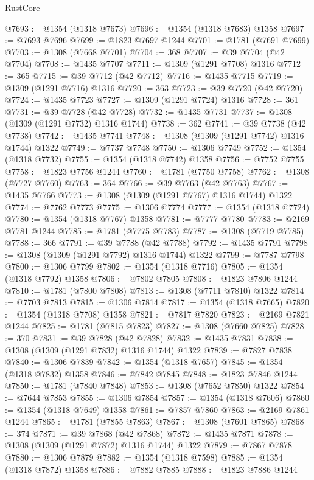 \begin{lexlean}{RustCore}
\begin{coremodule}
@7693 := @1354 (@1318 @7673)
@7696 := @1354 (@1318 @7683) @1358
@7697 := @7693 @7696
@7699 := @1823 @7697 @1244
@7701 := @1781 (@7691 @7699)
@7703 := @1308 (@7668 @7701)
@7704 := 368
@7707 := @39 @7704 (@42 @7704)
@7708 := @1435 @7707
@7711 := @1309 (@1291 @7708) @1316
@7712 := 365
@7715 := @39 @7712 (@42 @7712)
@7716 := @1435 @7715
@7719 := @1309 (@1291 @7716) @1316
@7720 := 363
@7723 := @39 @7720 (@42 @7720)
@7724 := @1435 @7723
@7727 := @1309 (@1291 @7724) @1316
@7728 := 361
@7731 := @39 @7728 (@42 @7728)
@7732 := @1435 @7731
@7737 := @1308 (@1309 (@1291 @7732) @1316 @1744)
@7738 := 362
@7741 := @39 @7738 (@42 @7738)
@7742 := @1435 @7741
@7748 := @1308 (@1309 (@1291 @7742) @1316 @1744) @1322
@7749 := @7737 @7748
@7750 := @1306 @7749
@7752 := @1354 (@1318 @7732)
@7755 := @1354 (@1318 @7742) @1358
@7756 := @7752 @7755
@7758 := @1823 @7756 @1244
@7760 := @1781 (@7750 @7758)
@7762 := @1308 (@7727 @7760)
@7763 := 364
@7766 := @39 @7763 (@42 @7763)
@7767 := @1435 @7766
@7773 := @1308 (@1309 (@1291 @7767) @1316 @1744) @1322
@7774 := @7762 @7773
@7775 := @1306 @7774
@7777 := @1354 (@1318 @7724)
@7780 := @1354 (@1318 @7767) @1358
@7781 := @7777 @7780
@7783 := @2169 @7781 @1244
@7785 := @1781 (@7775 @7783)
@7787 := @1308 (@7719 @7785)
@7788 := 366
@7791 := @39 @7788 (@42 @7788)
@7792 := @1435 @7791
@7798 := @1308 (@1309 (@1291 @7792) @1316 @1744) @1322
@7799 := @7787 @7798
@7800 := @1306 @7799
@7802 := @1354 (@1318 @7716)
@7805 := @1354 (@1318 @7792) @1358
@7806 := @7802 @7805
@7808 := @1823 @7806 @1244
@7810 := @1781 (@7800 @7808)
@7813 := @1308 (@7711 @7810) @1322
@7814 := @7703 @7813
@7815 := @1306 @7814
@7817 := @1354 (@1318 @7665)
@7820 := @1354 (@1318 @7708) @1358
@7821 := @7817 @7820
@7823 := @2169 @7821 @1244
@7825 := @1781 (@7815 @7823)
@7827 := @1308 (@7660 @7825)
@7828 := 370
@7831 := @39 @7828 (@42 @7828)
@7832 := @1435 @7831
@7838 := @1308 (@1309 (@1291 @7832) @1316 @1744) @1322
@7839 := @7827 @7838
@7840 := @1306 @7839
@7842 := @1354 (@1318 @7657)
@7845 := @1354 (@1318 @7832) @1358
@7846 := @7842 @7845
@7848 := @1823 @7846 @1244
@7850 := @1781 (@7840 @7848)
@7853 := @1308 (@7652 @7850) @1322
@7854 := @7644 @7853
@7855 := @1306 @7854
@7857 := @1354 (@1318 @7606)
@7860 := @1354 (@1318 @7649) @1358
@7861 := @7857 @7860
@7863 := @2169 @7861 @1244
@7865 := @1781 (@7855 @7863)
@7867 := @1308 (@7601 @7865)
@7868 := 374
@7871 := @39 @7868 (@42 @7868)
@7872 := @1435 @7871
@7878 := @1308 (@1309 (@1291 @7872) @1316 @1744) @1322
@7879 := @7867 @7878
@7880 := @1306 @7879
@7882 := @1354 (@1318 @7598)
@7885 := @1354 (@1318 @7872) @1358
@7886 := @7882 @7885
@7888 := @1823 @7886 @1244

\end{coremodule}
\end{lexlean}
